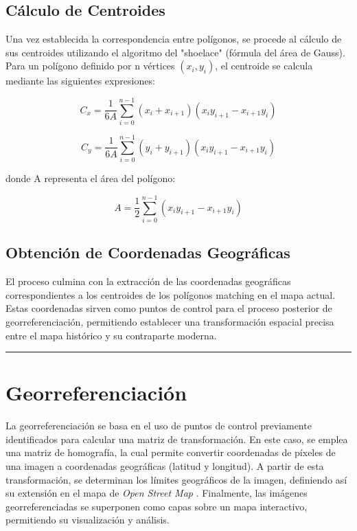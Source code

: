 \documentclass[twocolumn, fontsize=10pt]{article}
\begin{document}
\subsection{Cálculo de Centroides}

Una vez establecida la correspondencia entre polígonos, se procede al cálculo de sus centroides utilizando el algoritmo del "shoelace" \cite{shoelace} (fórmula del área de Gauss). Para un polígono definido por n vértices $(x_i, y_i)$, el centroide se calcula mediante las siguientes expresiones:

\begin{equation*}
    C_x = \frac{1}{6A} \sum_{i=0}^{n-1} (x_i + x_{i+1})(x_i y_{i+1} - x_{i+1} y_i)
\end{equation*}

\begin{equation*}
    C_y = \frac{1}{6A} \sum_{i=0}^{n-1} (y_i + y_{i+1})(x_i y_{i+1} - x_{i+1} y_i)
\end{equation*}

donde A representa el área del polígono:

\begin{equation*}
    A = \frac{1}{2} \sum_{i=0}^{n-1} (x_i y_{i+1} - x_{i+1} y_i)
\end{equation*}

\subsection{Obtención de Coordenadas Geográficas}

El proceso culmina con la extracción de las coordenadas geográficas correspondientes a los centroides de los polígonos matching en el mapa actual. Estas coordenadas sirven como puntos de control para el proceso posterior de georreferenciación, permitiendo establecer una transformación espacial precisa entre el mapa histórico y su contraparte moderna.

\rule{\linewidth}{0.5pt}
\section{Georreferenciación}

La georreferenciación se basa en el uso de puntos de control previamente identificados para calcular una matriz de transformación. En este caso, se emplea una matriz de homografía, la cual permite convertir coordenadas de píxeles de una imagen a coordenadas geográficas (latitud y longitud). A partir de esta transformación, se determinan los límites geográficos de la imagen, definiendo así su extensión en el mapa de \textit{Open Street Map} \cite{osm}. Finalmente, las imágenes georreferenciadas se superponen como capas sobre un mapa interactivo, permitiendo su visualización y análisis.
\end{document}
